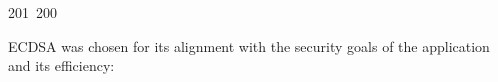 201~200~\documentclass{article}
\begin{document}
	                                                                                                                                                                                                                                                                                                	                                                                                                                                        	    	                                                                                                	                                                                                                                                                                                                                                                                                                                                	                                                                        	                                                                        	                                                                                                                                        	                                                                                                                                                                                                                        	                                                                    ECDSA was chosen for its alignment with the security goals of the application and its efficiency:
\end{document}
